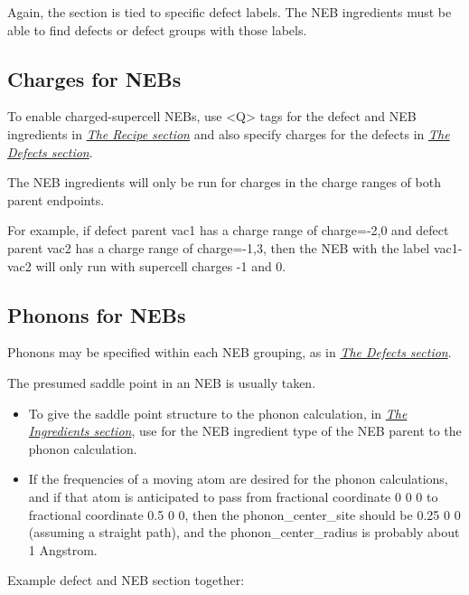\documentclass[letterpaper,10pt,english]{sphinxmanual}
\begin{document}
Again, the  section is tied to specific defect labels. The NEB ingredients must be able to find defects or defect groups with those labels.


\subsection{Charges for NEBs}
\label{3_1_6_neb:charges-for-nebs}
To enable charged-supercell NEBs, use \textless{}Q\textgreater{} tags for the defect and NEB ingredients in {\hyperref[3_1_3_recipe::doc]{\emph{The Recipe section}}} and also specify charges for the defects in {\hyperref[3_1_5_defects::doc]{\emph{The Defects section}}}.

The NEB ingredients will only be run for charges in the charge ranges of both parent endpoints.

For example, if defect parent vac1 has a charge range of charge=-2,0 and defect parent vac2 has a charge range of charge=-1,3, then the NEB with the label vac1-vac2 will only run with supercell charges -1 and 0.


\subsection{Phonons for NEBs}
\label{3_1_6_neb:phonons-for-nebs}
Phonons may be specified within each NEB grouping, as in {\hyperref[3_1_5_defects::doc]{\emph{The Defects section}}}.

The presumed saddle point in an NEB is usually taken.
\begin{itemize}
\item {} 
To give the saddle point structure to the phonon calculation, in {\hyperref[3_1_2_ingredients::doc]{\emph{The Ingredients section}}}, use  for the NEB ingredient type of the NEB parent to the phonon calculation.

\item {} 
If the frequencies of a moving atom are desired for the phonon calculations, and if that atom is anticipated to pass from fractional coordinate 0 0 0 to fractional coordinate 0.5 0 0, then the phonon\_center\_site should be 0.25 0 0 (assuming a straight path), and the phonon\_center\_radius is probably about 1 Angstrom.

\end{itemize}

Example defect and NEB section together:
\end{document}
